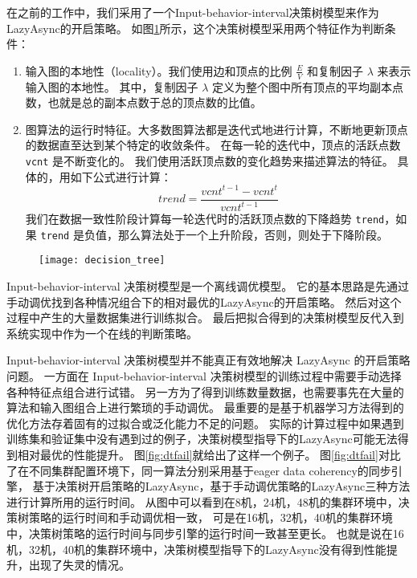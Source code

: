在之前的工作中，我们采用了一个Input-behavior-interval决策树模型来作为LazyAsync的开启策略。
如图\ref{fig:dtree}所示，这个决策树模型采用两个特征作为判断条件：

\begin{enumerate}
  \item 输入图的本地性（locality）。我们使用边和顶点的比例 $\frac{E}{V}$ 和复制因子 $\lambda$ 来表示输入图的本地性。
  其中，复制因子 $\lambda$ 定义为整个图中所有顶点的平均副本点数，也就是总的副本点数于总的顶点数的比值。
  \item 图算法的运行时特征。大多数图算法都是迭代式地进行计算，不断地更新顶点的数据直至达到某个特定的收敛条件。
  在每一轮的迭代中，顶点的活跃点数\verb|vcnt| 是不断变化的。
  我们使用活跃顶点数的变化趋势来描述算法的特征。
  具体的，用如下公式进行计算：
  \begin{equation}
  \label{equ:chap04:trend}
  trend = \frac{vcnt^{t-1}-vcnt^t}{vcnt^{t-1}}
  \end{equation}
  我们在数据一致性阶段计算每一轮迭代时的活跃顶点数的下降趋势 \verb|trend|，如果 \verb|trend| 是负值，那么算法处于一个上升阶段，否则，则处于下降阶段。
\end{enumerate}

\begin{figure}[!htbp]
\centering
\texttt{[image: decision\_tree]}
\label{fig:dtree}
\end{figure}


Input-behavior-interval 决策树模型是一个离线调优模型。
它的基本思路是先通过手动调优找到各种情况组合下的相对最优的LazyAsync的开启策略。
然后对这个过程中产生的大量数据集进行训练拟合。
最后把拟合得到的决策树模型反代入到系统实现中作为一个在线的判断策略。


Input-behavior-interval 决策树模型并不能真正有效地解决 LazyAsync 的开启策略问题。
一方面在 Input-behavior-interval 决策树模型的训练过程中需要手动选择各种特征点组合进行试错。
另一方为了得到训练数量数据，也需要事先在大量的算法和输入图组合上进行繁琐的手动调优。
最重要的是基于机器学习方法得到的优化方法存着固有的过拟合或泛化能力不足的问题。
实际的计算过程中如果遇到训练集和验证集中没有遇到过的例子，决策树模型指导下的LazyAsync可能无法得到相对最优的性能提升。
图\ref{fig:dtfail}就给出了这样一个例子。
图\ref{fig:dtfail}对比了在不同集群配置环境下，同一算法分别采用基于eager data coherency的同步引擎，
基于决策树开启策略的LazyAsync，基于手动调优策略的LazyAsync三种方法进行计算所用的运行时间。
从图中可以看到在8机，24机，48机的集群环境中，决策树策略的运行时间和手动调优相一致，
可是在16机，32机，40机的集群环境中，决策树策略的运行时间与同步引擎的运行时间一致甚至更长。
也就是说在16机，32机，40机的集群环境中，决策树模型指导下的LazyAsync没有得到性能提升，出现了失灵的情况。

